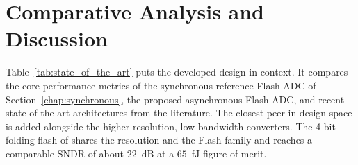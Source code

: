 \section{Comparative Analysis and Discussion}
\label{sec:comparative_analysis}

Table~\ref{tab:state_of_the_art} puts the developed design in context. It compares the core performance metrics of the synchronous reference Flash ADC of Section~\ref{chap:synchronous}, the proposed asynchronous Flash ADC, and recent state-of-the-art architectures from the literature. The closest peer in design space is added alongside the higher-resolution, low-bandwidth converters. The 4-bit folding-flash of \cite{nasri2016} shares the resolution and the Flash family and reaches a comparable SNDR of about $22$~dB at a $65$~fJ figure of merit.

